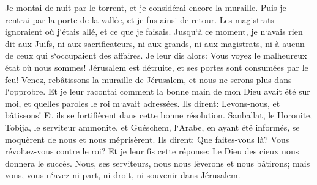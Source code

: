 \verse Je montai de nuit par le torrent, et je considérai encore la muraille. Puis je rentrai par la porte de la vallée, et je fus ainsi de retour. 
\verse Les magistrats ignoraient où j`étais allé, et ce que je faisais. Jusqu`à ce moment, je n`avais rien dit aux Juifs, ni aux sacrificateurs, ni aux grands, ni aux magistrats, ni à aucun de ceux qui s`occupaient des affaires. 
\verse Je leur dis alors: Vous voyez le malheureux état où nous sommes! Jérusalem est détruite, et ses portes sont consumées par le feu! Venez, rebâtissons la muraille de Jérusalem, et nous ne serons plus dans l`opprobre. 
\verse Et je leur racontai comment la bonne main de mon Dieu avait été sur moi, et quelles paroles le roi m`avait adressées. Ils dirent: Levons-nous, et bâtissons! Et ils se fortifièrent dans cette bonne résolution. 
\verse Sanballat, le Horonite, Tobija, le serviteur ammonite, et Guéschem, l`Arabe, en ayant été informés, se moquèrent de nous et nous méprisèrent. Ils dirent: Que faites-vous là? Vous révoltez-vous contre le roi? 
\verse Et je leur fis cette réponse: Le Dieu des cieux nous donnera le succès. Nous, ses serviteurs, nous nous lèverons et nous bâtirons; mais vous, vous n`avez ni part, ni droit, ni souvenir dans Jérusalem. 

